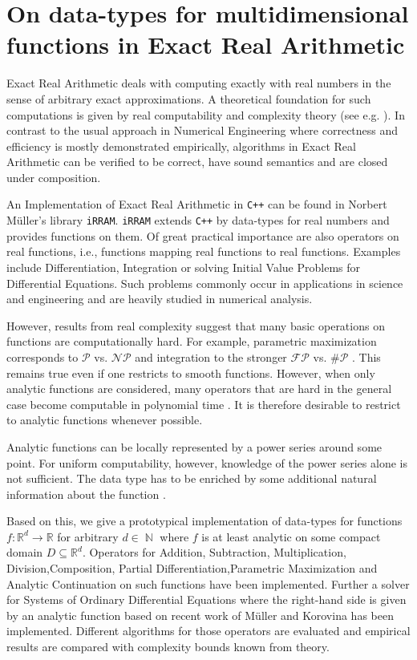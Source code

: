 \documentclass{article}
\newcommand{\RR}{\mathbb R}
\DeclareMathOperator{\NN}{\mathbb N}
\newcommand{\p}{\ensuremath{\mathcal P}\xspace}
\newcommand{\np}{\ensuremath{\mathcal{NP}}\xspace}
\newcommand{\fp}{\ensuremath{\mathcal{FP}}\xspace}
\newcommand{\sharpp}{\ensuremath{\# \mathcal{P}}\xspace}
\newcommand{\cc}{\texttt{C++}\xspace}
\newcommand{\irram}{\texttt{iRRAM}\xspace}
\begin{document}
\section*{On data-types for multidimensional functions in Exact Real Arithmetic}
Exact Real Arithmetic deals with computing exactly with real numbers in the sense of arbitrary exact approximations. 
A theoretical foundation for such computations is given by real computability and complexity theory (see e.g. \cite{MR0089809, MR1137517,Weihrauch}).
In contrast to the usual approach in Numerical Engineering where correctness and efficiency is mostly demonstrated empirically, algorithms in Exact Real Arithmetic can be verified to be correct, have sound semantics and are closed under composition.


An Implementation of Exact Real Arithmetic in \cc can be found in Norbert Müller's library \irram \cite{Mueller00}.
\irram extends \cc by data-types for real numbers and provides functions on them.
Of great practical importance are also operators on real functions, i.e., functions mapping real functions to real functions.
Examples include Differentiation, Integration or solving Initial Value Problems for Differential Equations.
Such problems commonly occur in applications in science and engineering and are heavily studied in numerical analysis.

However, results from real complexity suggest that many basic operations on functions are computationally hard. 
For example, parametric maximization corresponds to $\p$ vs. $\np$ \cite{MR666209} and integration to the stronger $\fp$ vs. $\sharpp$ \cite{MR748898}.
This remains true even if one restricts to smooth functions.
However, when only analytic functions are considered, many operators that are hard in the general case become computable in polynomial time \cite{Kawamura2012}.
It is therefore desirable to restrict to analytic functions whenever possible.

Analytic functions can be locally represented by a power series around some point.
For uniform computability, however, knowledge of the power series alone is not sufficient.
The data type has to be enriched by some additional natural information about the function \cite{Mueller87}.

Based on this, we give a prototypical implementation of data-types for functions $f: \RR^d \to \RR$ for arbitrary $d \in \NN$ where $f$ is at least analytic on some compact domain $D \subseteq \RR^d$.
Operators for Addition, Subtraction, Multiplication, Division,Composition, Partial Differentiation,Parametric Maximization and Analytic Continuation on such functions have been implemented.
Further a solver for Systems of Ordinary Differential Equations where the right-hand side is given by an analytic function based on recent work of M\"uller and Korovina \cite{DBLP:journals/corr/abs-1006-0401} has been implemented.
Different algorithms for those operators are evaluated and empirical results are compared with complexity bounds known from theory. 


{}
\end{document}
